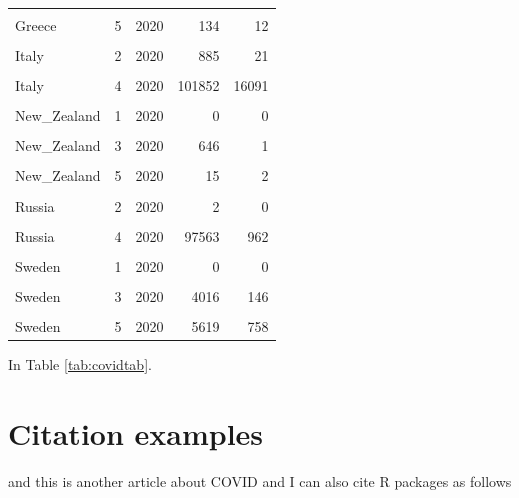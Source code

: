 \documentclass[11pt,a4paper,]{article}
\begin{document}
\begin{table}[!h]
\begin{tabular}[t]{lrrrr}
\cellcolor{gray!6}{Greece} & \cellcolor{gray!6}{4} & \cellcolor{gray!6}{2020} & \cellcolor{gray!6}{1364} & \cellcolor{gray!6}{96}\\
Greece & 5 & 2020 & 134 & 12\\
\addlinespace
\cellcolor{gray!6}{Italy} & \cellcolor{gray!6}{1} & \cellcolor{gray!6}{2020} & \cellcolor{gray!6}{3} & \cellcolor{gray!6}{0}\\
Italy & 2 & 2020 & 885 & 21\\
\cellcolor{gray!6}{Italy} & \cellcolor{gray!6}{3} & \cellcolor{gray!6}{2020} & \cellcolor{gray!6}{100851} & \cellcolor{gray!6}{11570}\\
Italy & 4 & 2020 & 101852 & 16091\\
\cellcolor{gray!6}{Italy} & \cellcolor{gray!6}{5} & \cellcolor{gray!6}{2020} & \cellcolor{gray!6}{14677} & \cellcolor{gray!6}{2713}\\
\addlinespace
New\_Zealand & 1 & 2020 & 0 & 0\\
\cellcolor{gray!6}{New\_Zealand} & \cellcolor{gray!6}{2} & \cellcolor{gray!6}{2020} & \cellcolor{gray!6}{1} & \cellcolor{gray!6}{0}\\
New\_Zealand & 3 & 2020 & 646 & 1\\
\cellcolor{gray!6}{New\_Zealand} & \cellcolor{gray!6}{4} & \cellcolor{gray!6}{2020} & \cellcolor{gray!6}{482} & \cellcolor{gray!6}{18}\\
New\_Zealand & 5 & 2020 & 15 & 2\\
\addlinespace
\cellcolor{gray!6}{Russia} & \cellcolor{gray!6}{1} & \cellcolor{gray!6}{2020} & \cellcolor{gray!6}{0} & \cellcolor{gray!6}{0}\\
Russia & 2 & 2020 & 2 & 0\\
\cellcolor{gray!6}{Russia} & \cellcolor{gray!6}{3} & \cellcolor{gray!6}{2020} & \cellcolor{gray!6}{1834} & \cellcolor{gray!6}{10}\\
Russia & 4 & 2020 & 97563 & 962\\
\cellcolor{gray!6}{Russia} & \cellcolor{gray!6}{5} & \cellcolor{gray!6}{2020} & \cellcolor{gray!6}{99277} & \cellcolor{gray!6}{855}\\
\addlinespace
Sweden & 1 & 2020 & 0 & 0\\
\cellcolor{gray!6}{Sweden} & \cellcolor{gray!6}{2} & \cellcolor{gray!6}{2020} & \cellcolor{gray!6}{12} & \cellcolor{gray!6}{0}\\
Sweden & 3 & 2020 & 4016 & 146\\
\cellcolor{gray!6}{Sweden} & \cellcolor{gray!6}{4} & \cellcolor{gray!6}{2020} & \cellcolor{gray!6}{16274} & \cellcolor{gray!6}{2316}\\
Sweden & 5 & 2020 & 5619 & 758\\
\bottomrule
\end{tabular}
\end{table}

In Table \ref{tab:covidtab}.

\clearpage

\hypertarget{citation-examples}{%
\section{Citation examples}\label{citation-examples}}

\textcite{BC64} and this is another article about COVID \textcite{bai2020presumed} and I can also cite R packages as follows \textcite{ggplot2}

\printbibliography
\end{document}

